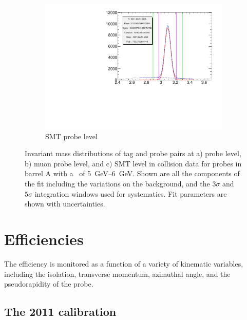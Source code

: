 \begin{figure}[thbp]
    \begin{subfigure}[b]{0.54\textwidth}
      \includegraphics[width=\textwidth]{PartCalibration2012/Plots/Kinematics/Data_InvMass_pt_5_6_barrel_smt.pdf}
      \caption{SMT probe level}   
    \end{subfigure}
    \caption[Invariant mass distributions of tag and probe pairs at probe level, muon probe level, and SMT level in collision data for probes in barrel A with a \pt\ of {\SIrange[range-units=single]{5}{6}{\GeV}}.]{Invariant mass distributions of tag and probe pairs at a) probe level, b) muon probe level, and c) SMT level in collision data for probes in barrel A with a \pt\ of \SIrange[range-units=single]{5}{6}{\GeV}. Shown are all the components of the fit including the variations on the background, and the $3\sigma$ and $5\sigma$ integration windows used for systematics. Fit parameters are shown with uncertainties.}
  \label{fig:CalibrationFittingResult}
\end{figure}

\section{Efficiencies} \label{sec:CalibrationEfficiencies}

The efficiency is monitored as a function of a variety of kinematic variables, including the isolation, transverse momentum, azimuthal angle, and the pseudorapidity of the probe.

\subsection{The 2011 calibration}

